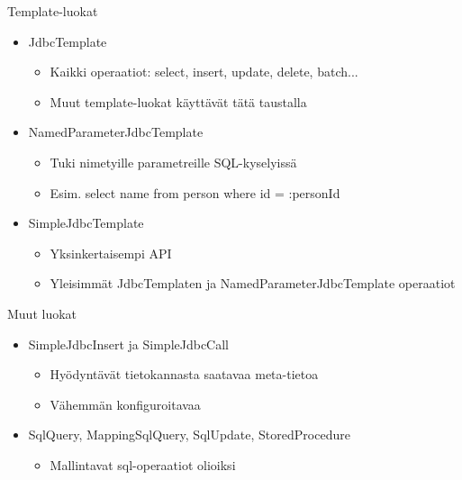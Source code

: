 \documentclass[hyperref={pdfauthor=\AUTHOR},14pt]{beamer}
\begin{document}
\begin{frame}[t, fragile]{Template-luokat}
\begin{itemize}
\item JdbcTemplate
\begin{itemize}
\item Kaikki operaatiot: select, insert, update, delete, batch...
\item Muut template-luokat käyttävät tätä taustalla
\end{itemize}
\item NamedParameterJdbcTemplate
\begin{itemize}
\item Tuki nimetyille parametreille SQL-kyselyissä
\item Esim. select name from person where id = :personId
\end{itemize}
\item SimpleJdbcTemplate
\begin{itemize}
\item Yksinkertaisempi API
\item Yleisimmät JdbcTemplaten ja NamedParameterJdbcTemplate operaatiot
\end{itemize}
\end{itemize}
\end{frame}

\begin{frame}[t, fragile]{Muut luokat}
\begin{itemize}
\item SimpleJdbcInsert ja SimpleJdbcCall
\begin{itemize}
\item Hyödyntävät tietokannasta saatavaa meta-tietoa
\item Vähemmän konfiguroitavaa
\end{itemize}
\item SqlQuery, MappingSqlQuery, SqlUpdate, StoredProcedure
\begin{itemize}
\item Mallintavat sql-operaatiot olioiksi 
\end{itemize}
\end{itemize}
\end{frame}

\end{document}
